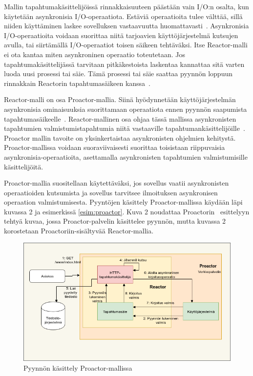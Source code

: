 \documentclass[finnish]{tktltiki2}
\theoremstyle{definition}
\theoremstyle{remark}
\begin{document}
Mallin tapahtumakäsittelijöissä rinnakkaisuuteen päästään
vain I/O:n osalta, kun käytetään asynkronisia
I/O-operaatiota.
Estäviä operaatioita tulee välttää,
sillä niiden käyttäminen laskee sovelluksen
vastaavuutta huomattavasti~\cite{schmidt_reactor:_1995}.
Asynkronisia I/O-operaatioita
voidaan suorittaa niitä tarjoavien käyttöjärjestelmä kutsujen
avulla, tai siirtämällä I/O-operaatiot toisen säikeen tehtäväksi.
Itse Reactor-malli ei ota kantaa miten asynkroninen operaatio toteutetaan.
Jos tapahtumakäsittelijässä tarvitaan pitkäkestoista laskentaa
kannattaa sitä varten luoda uusi prosessi tai säie. Tämä
prosessi tai säie saattaa pyynnön loppuun rinnakkain
Reactorin tapahtumasäikeen kanssa~\cite{schmidt_reactor:_1995}.

Reactor-malli on osa Proactor-mallia.
Siinä hyödynnetään käyttöjärjestelmän asynkronisia ominaisuuksia suorittamaan
operaatiota ennen pyynnön saapumista tapahtumasäikeelle~\cite{pyarali_proactor_1997}.
Reactor-mallinen osa ohjaa tässä mallissa asynkronisten tapahtumien
valmistumistapahtumia niitä vastaaville tapahtumankäsittelijöille~\cite{pyarali_proactor_1997}.
Proactor mallin tavoite on yksinkertaistaa asynkronisten ohjelmien kehitystä.
Proactor-mallissa voidaan suoraviivaisesti suorittaa toisistaan riippuvaisia
asynkronisia-operaatioita, asettamalla asynkronisten tapahtumien valmistumisille
käsittelijöitä.

Proactor-mallia suositellaan käytettäväksi, jos sovellus vaatii
asynkronisten operaatioiden kutsumista ja sovellus tarvitsee ilmoituksen
asynkronisen operaation valmistumisesta.
Pyyntöjen käsittely Proactor-mallissa käydään läpi kuvassa 2 ja
esimerkissä \autoref{esim:proactor}.
Kuva 2 noudattaa Proactorin~\cite{pyarali_proactor_1997} esittelyyn tehtyä
kuvaa, jossa Proactor-palvelin käsittelee pyynnön, mutta kuvassa 2 
korostetaan Proactoriin-sisältyvää Reactor-mallia.
\begin{figure}
    \caption{Pyynnön käsittely Proactor-mallissa~\cite{pyarali_proactor_1997}}
\includegraphics[scale=0.5]{Proactor.png}
\end{figure}
\end{document}
